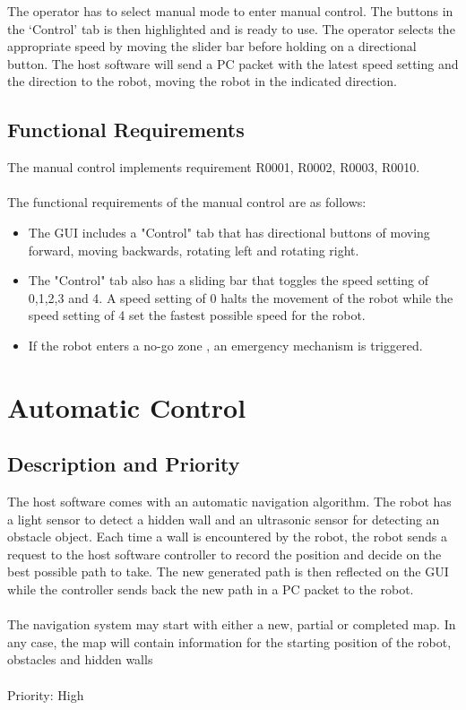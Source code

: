 \documentclass[11pt, a4paper]{report}
\begin{document}
The operator has to select manual mode to enter manual control. The buttons in the
`Control' tab is then highlighted and is ready to use. The operator selects the appropriate speed by
moving the slider bar before holding on a directional button. The host software will send a PC packet
with the latest speed setting and the direction to the robot, moving the robot in the
indicated direction.

\subsection{Functional Requirements}


The manual control implements requirement R0001, R0002, R0003, R0010.\\ \\
The functional requirements of the manual control are as follows:
\begin{itemize}
	\item The GUI includes a "Control" tab that has directional buttons of moving
	forward, moving backwards, rotating left and rotating right.
	\item The "Control" tab also has a sliding bar that toggles the speed setting of 0,1,2,3 and 4. A speed
	setting of 0 halts the movement of the robot while the speed setting of 4 set the fastest possible
	speed for the robot.
	\item If the robot enters a no-go zone , an emergency mechanism is triggered.
\end{itemize}


\section {Automatic Control}
\subsection {Description and Priority}
The host software comes with an automatic navigation algorithm. The robot has a light sensor to detect a hidden wall and an ultrasonic sensor for detecting an obstacle object. Each time a wall is encountered by the robot, the robot sends a request to the host software controller to record the position and decide on the best possible path to take. The new generated path is then reflected on the GUI while the controller sends back the new path in a PC packet to the robot.\\ \\
The navigation system may start with either a new, partial or completed map. In any case, the map
will contain information for the starting position of the robot, obstacles and hidden walls\\ \\
Priority: High
\end{document}
